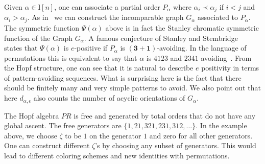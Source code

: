 \documentclass[ALCO,ThmDefs,Unicode,epreuves]{cedram}
\begin{document}
\begin{rema} Given $\alpha\in\mathbf{l}[n]$, one can associate a partial order $P_\alpha$ where $\alpha_i\prec \alpha_j$ if $i<j$ and $\alpha_i>\alpha_j$. 
As in~\cite{stanley} we can construct the incomparable graph $G_\alpha$ associated to $P_\alpha$. 
The symmetric function $\Psi(\alpha)$ above is in fact the Stanley chromatic symmetric function of the Graph $G_\alpha$.
A famous conjecture of Stanley and Stembridge~\cite{stanley} states that $\Psi(\alpha)$ is $e$-positive if $P_\alpha$ is $(\mathbf{3}+ \mathbf{1})$-avoiding.
In the language of permutations this is equivalent to say that $\alpha$ is $4123$ and $2341$ avoiding~\cite{Atkinson-Sagan}.
From the Hopf structure, one can see that it is natural to describe $e$ positivity in terms of pattern-avoiding sequences.
What is surprising here is the fact that there should be finitely many and very simple patterns to avoid.
We also point out that here $d_{\alpha,\epsilon}$ also counts the number of acyclic orientations of $G_\alpha$.
\end{rema}

The Hopf algebra $PR$ is free and generated by total orders that do not have any global ascent.
The free generators are $\{1,21,321,231,312,\ldots\}$. In the example above, we choose $\zeta$ to be $1$
on the generator $1$ and zero for all other generators. One can construct different $\zeta$'s by choosing any
subset of generators. This would lead to different coloring schemes and new identities with permutations.
\end{document}
